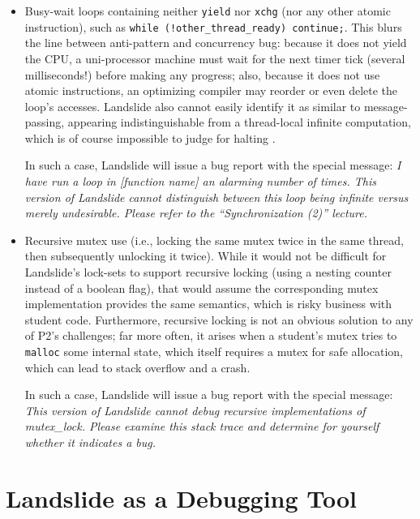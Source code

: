 \begin{itemize}
	\item Busy-wait loops containing neither {\tt yield} nor {\tt xchg} (nor any other atomic instruction), such as {\tt while (!other\_thread\_ready) continue;}.
		This blurs the line between anti-pattern and concurrency bug:
		because it does not yield the CPU, a uni-processor machine must wait for the next timer tick (several milliseconds!) before making any progress;
		also, because it does not use atomic instructions, an optimizing compiler may reorder or even delete the loop's accesses.
		Landslide also cannot easily identify it as similar to message-passing,
		appearing indistinguishable
		from a thread-local infinite computation,
		which is of course impossible to judge for halting \cite{entscheidungsproblem}.

		In such a case, Landslide will issue a bug report with the special message:
		{\em I have run a loop in [function name] an alarming number of times.
		This version of Landslide cannot distinguish between this loop being infinite versus merely undesirable.
		Please refer to the ``Synchronization (2)'' lecture.}
	\item Recursive mutex use (i.e., locking the same mutex twice in the same thread, then subsequently unlocking it twice).
		While it would not be difficult for Landslide's lock-sets to support recursive locking (using a nesting counter instead of a boolean flag),
		that would assume the corresponding mutex implementation provides the same semantics,
		which is risky business with student code. %
		Furthermore, recursive locking is not an obvious solution to any of P2's challenges;
		far more often, it arises when a student's mutex tries to {\tt malloc} some internal state,
		which itself requires a mutex for safe allocation, which can lead to stack overflow and a crash.

		In such a case, Landslide will issue a bug report with the special message:
		{\em This version of Landslide cannot debug recursive implementations of mutex\_lock.
		Please examine this stack trace and determine for yourself whether it indicates a bug.}
\end{itemize}

\section{Landslide as a Debugging Tool}
\label{sec:studence}

